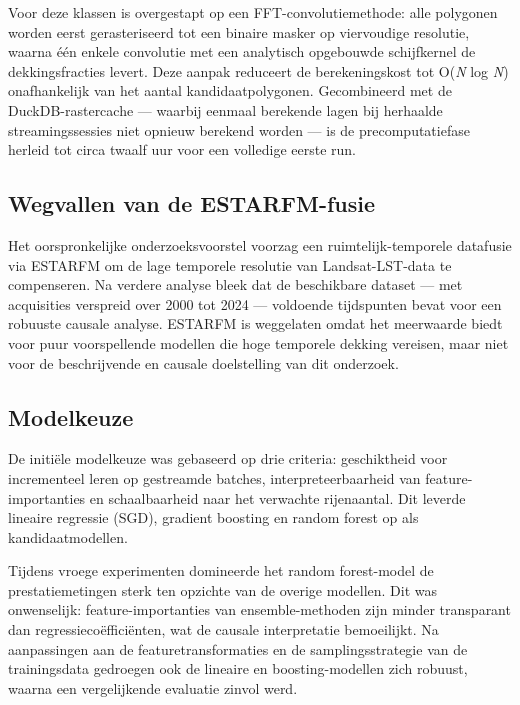 Voor deze klassen is overgestapt op een FFT-convolutiemethode: alle polygonen worden eerst gerasteriseerd tot een binaire masker op viervoudige resolutie, waarna één enkele convolutie met een analytisch opgebouwde schijfkernel de dekkingsfracties levert.
Deze aanpak reduceert de berekeningskost tot O(\textit{N} log \textit{N}) onafhankelijk van het aantal kandidaatpolygonen.
Gecombineerd met de DuckDB-rastercache — waarbij eenmaal berekende lagen bij herhaalde streamingssessies niet opnieuw berekend worden — is de precomputatiefase herleid tot circa twaalf uur voor een volledige eerste run.

\subsection{Wegvallen van de ESTARFM-fusie}

Het oorspronkelijke onderzoeksvoorstel voorzag een ruimtelijk-temporele datafusie via ESTARFM \autocite{Zhu2010} om de lage temporele resolutie van Landsat-LST-data te compenseren.
Na verdere analyse bleek dat de beschikbare dataset — met acquisities verspreid over 2000 tot 2024 — voldoende tijdspunten bevat voor een robuuste causale analyse.
ESTARFM is weggelaten omdat het meerwaarde biedt voor puur voorspellende modellen die hoge temporele dekking vereisen, maar niet voor de beschrijvende en causale doelstelling van dit onderzoek.

\subsection{Modelkeuze}

De initiële modelkeuze was gebaseerd op drie criteria: geschiktheid voor incrementeel leren op gestreamde batches, interpreteerbaarheid van feature-importanties en schaalbaarheid naar het verwachte rijenaantal.
Dit leverde lineaire regressie (SGD), gradient boosting en random forest op als kandidaatmodellen.

Tijdens vroege experimenten domineerde het random forest-model de prestatiemetingen sterk ten opzichte van de overige modellen.
Dit was onwenselijk: feature-importanties van ensemble-methoden zijn minder transparant dan regressiecoëfficiënten, wat de causale interpretatie bemoeilijkt.
Na aanpassingen aan de featuretransformaties en de samplingsstrategie van de trainingsdata gedroegen ook de lineaire en boosting-modellen zich robuust, waarna een vergelijkende evaluatie zinvol werd.


